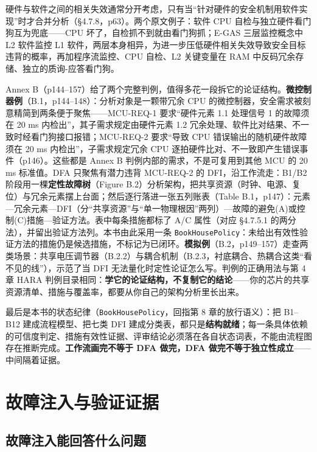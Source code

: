 硬件与软件之间的相关失效通常分开考虑，只有当“针对硬件的安全机制用软件实现”时才合并分析（§4.7.8，p63）。两个原文例子：软件 CPU 自检与独立硬件看门狗互为兜底——CPU 坏了，自检抓不到就由看门狗抓；E-GAS 三层监控概念中 L2 软件监控 L1 软件，两层本身相异，为进一步压低硬件相关失效导致安全目标违背的概率，再加程序流监控、CPU 自检、L2 关键变量在 RAM 中反码冗余存储、独立的质询-应答看门狗。

Annex B（p144–157）给了两个完整判例，值得多花一段拆它的论证结构。\textbf{微控制器例}（B.1，p144–148）：分析对象是一颗带冗余 CPU 的微控制器，安全需求被刻意精简到两条便于聚焦——MCU-REQ-1 要求“硬件元素 1.1 处理信号 1 的故障须在 20 ms 内检出”，其子需求规定由硬件元素 1.2 冗余处理、软件比对结果、不一致时经看门狗接口报错；MCU-REQ-2 要求“导致 CPU 错误输出的随机硬件故障须在 20 ms 内检出”，子需求规定冗余 CPU 逐拍硬件比对、不一致即产生错误事件（p146）。这些都是 Annex B 判例内部的需求，不是可复用到其他 MCU 的 20 ms 标准值。DFA 只聚焦有潜力违背 MCU-REQ-2 的 DFI，沿工作流走：B1/B2 阶段用一棵\textbf{定性故障树}（Figure B.2）分析架构，把共享资源（时钟、电源、复位）与冗余元素摆上台面；然后逐行落进一张五列账表（Table B.1，p147）：元素—冗余元素—DFI（分“共享资源”与“单一物理根因”两列）—故障的避免(A)或控制(C)措施—验证方法。表中每条措施都标了 A/C 属性（对应 §4.7.5.1 的两分法），并留出验证方法列。本书由此采用一条 \nolinkurl{BookHousePolicy}：未给出有效性验证方法的措施仍是候选措施，不标记为已闭环。\textbf{模拟例}（B.2，p149–157）走查两类场景：共享电压调节器（B.2.2）与耦合机制（B.2.3，衬底耦合、热耦合这类“看不见的线”），示范了当 DFI 无法量化时定性论证怎么写。判例的正确用法与第 4 章 HARA 判例目录相同：\textbf{学它的论证结构，不复制它的结论}——你的芯片的共享资源清单、措施与覆盖率，都要从你自己的架构分析里长出来。

最后是本书的状态纪律（\nolinkurl{BookHousePolicy}，回指第 8 章的放行语义）：把 B1–B12 建成流程模型、把七类 DFI 建成分类表，都只是\textbf{结构就绪}；每一条具体依赖的可信度判定、措施有效性证据、评审结论必须落在各自状态词表，不能由流程图存在推断完成。\textbf{工作流画完不等于 DFA 做完，DFA 做完不等于独立性成立}——中间隔着证据。

\section{故障注入与验证证据}

\subsection{故障注入能回答什么问题}

